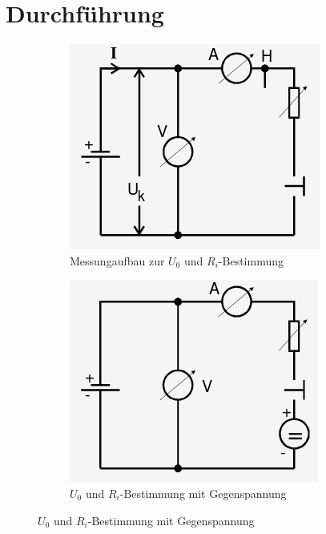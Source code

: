 \section{Durchführung}
\label{sec:Durchführung}

\renewcommand{\labelenumi}{\alph{enumi})}
\begin{enumerate}


\begin{figure}[H]
    \centering
    \caption{}
    \begin{subfigure}{0.48\textwidth}
      \centering
      \includegraphics[width=\linewidth-60pt,height=\textheight-60pt,keepaspectratio]{content/Spannungsquelle2.png}
      \caption{\footnotesize Messungaufbau zur $U_0$ und $R_i$-Bestimmung}
      \label{fig:Spannung2}
    \end{subfigure}
    \begin{subfigure}{0.48\textwidth}
      \centering
      \includegraphics[width=\linewidth-60pt,height=\textheight-60pt,keepaspectratio]{content/Spannungsquelle3.png}
      \caption{\footnotesize $U_0$ und $R_i $-Bestimmung mit Gegenspannung}
      \label{fig:Spannung3}
    \end{subfigure}
  \end{figure}



\end{enumerate}
